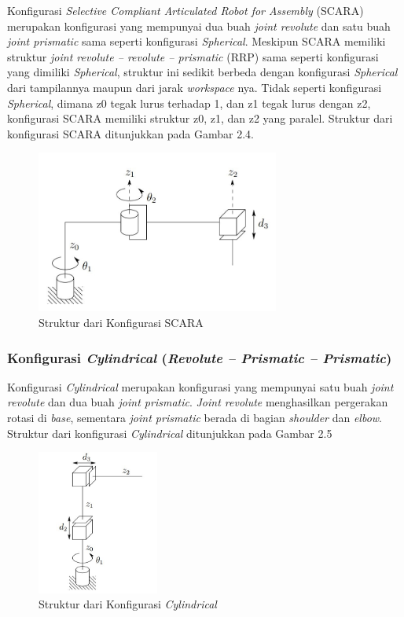 Konfigurasi \textit{Selective Compliant Articulated Robot for Assembly} (SCARA) merupakan konfigurasi yang mempunyai dua buah \textit{joint revolute} dan satu buah \textit{joint prismatic} sama seperti konfigurasi \textit{Spherical}. Meskipun SCARA memiliki struktur \textit{joint revolute – revolute – prismatic} (RRP) sama seperti konfigurasi yang dimiliki \textit{Spherical}, struktur ini sedikit berbeda dengan konfigurasi \textit{Spherical} dari tampilannya maupun dari jarak \textit{workspace} nya. Tidak seperti konfigurasi \textit{Spherical}, dimana z0 tegak lurus terhadap 1, dan z1 tegak lurus dengan z2, konfigurasi SCARA memiliki struktur z0, z1, dan z2 yang paralel. Struktur dari konfigurasi SCARA ditunjukkan pada Gambar 2.4.
	\begin{figure}[H]
	\centering
	\includegraphics[width=8cm]{gambar/scara.jpg}
	\caption{Struktur dari Konfigurasi SCARA}
\end{figure}

\subsubsection{Konfigurasi \textit{Cylindrical} (\textit{Revolute – Prismatic – Prismatic}) } 

Konfigurasi \textit{Cylindrical} merupakan konfigurasi yang mempunyai satu buah \textit{joint revolute} dan dua buah \textit{joint prismatic}. \textit{Joint revolute} menghasilkan pergerakan rotasi di \textit{base}, sementara \textit{joint prismatic} berada di bagian \textit{shoulder} dan \textit{elbow}. Struktur dari konfigurasi \textit{Cylindrical} ditunjukkan pada Gambar 2.5
	\begin{figure}[H]
	\centering
	\includegraphics[width=4cm]{gambar/cylindrical.jpg}
	\caption{Struktur dari Konfigurasi \textit{Cylindrical}}
\end{figure}
